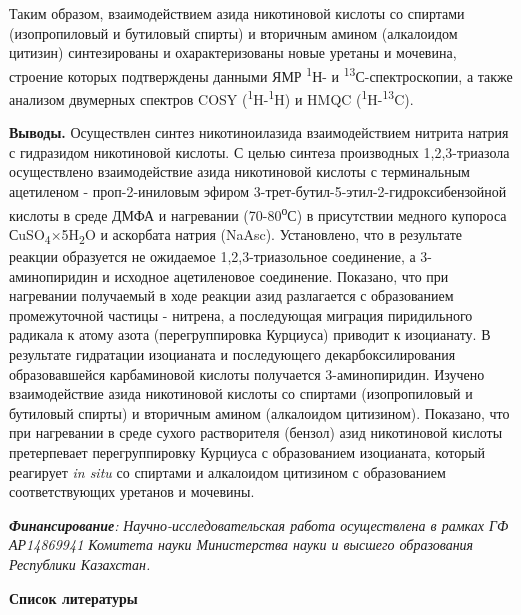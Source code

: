 \begin{multicols}{2}
Таким образом, взаимодействием азида никотиновой кислоты со спиртами
(изопропиловый и бутиловый спирты) и вторичным амином (алкалоидом
цитизин) синтезированы и охарактеризованы новые уретаны и мочевина,
строение которых подтверждены данными ЯМР \textsuperscript{1}Н- и
\textsuperscript{13}С-спектроскопии, а также анализом двумерных спектров
COSY (\textsuperscript{1}H-\textsuperscript{1}H) и HMQC
(\textsuperscript{1}H-\textsuperscript{13}C).

{\bfseries Выводы.} Осуществлен синтез никотиноилазида взаимодействием
нитрита натрия с гидразидом никотиновой кислоты. С целью синтеза
производных 1,2,3-триазола осуществлено взаимодействие азида никотиновой
кислоты с терминальным ацетиленом - проп-2-иниловым эфиром
3-трет-бутил-5-этил-2-гидроксибензойной кислоты в среде ДМФА и
нагревании (70-80\textsuperscript{о}С) в присутствии медного купороса
СuSO\textsubscript{4}×5H\textsubscript{2}O и аскорбата натрия (NaAsc).
Установлено, что в результате реакции образуется не ожидаемое
1,2,3-триазольное соединение, а 3-аминопиридин и исходное ацетиленовое
соединение. Показано, что при нагревании получаемый в ходе реакции азид
разлагается с образованием промежуточной частицы - нитрена, а
последующая миграция пиридильного радикала к атому азота
(перегруппировка Курциуса) приводит к изоцианату. В результате
гидратации изоцианата и последующего декарбоксилирования образовавшейся
карбаминовой кислоты получается 3-аминопиридин. Изучено взаимодействие
азида никотиновой кислоты со спиртами (изопропиловый и бутиловый спирты)
и вторичным амином (алкалоидом цитизином). Показано, что при нагревании
в среде сухого растворителя (бензол) азид никотиновой кислоты
претерпевает перегруппировку Курциуса с образованием изоцианата, который
реагирует \emph{in situ} со спиртами и алкалоидом цитизином с
образованием соответствующих уретанов и мочевины.

\emph{{\bfseries Финансирование}:} \emph{Научно-исследовательская работа
осуществлена в рамках ГФ АР14869941 Комитета науки Министерства науки и
высшего образования Республики Казахстан.}
\end{multicols}

\begin{center}
{\bfseries Список литературы}
\end{center}

